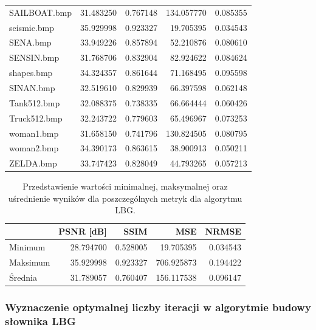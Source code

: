 \documentclass{article}
\begin{document}
\begin{table}[!ht]
\begin{tabular}{@{}lrrrr@{}}
    SAILBOAT.bmp       & 31.483250     & 0.767148 & 134.057770 & 0.085355 \\
    seismic.bmp        & 35.929998     & 0.923327 & 19.705395  & 0.034543 \\
    SENA.bmp           & 33.949226     & 0.857894 & 52.210876  & 0.080610 \\
    SENSIN.bmp         & 31.768706     & 0.832904 & 82.924622  & 0.084624 \\
    shapes.bmp         & 34.324357     & 0.861644 & 71.168495  & 0.095598 \\
    SINAN.bmp          & 32.519610     & 0.829939 & 66.397598  & 0.062148 \\
    Tank512.bmp        & 32.088375     & 0.738335 & 66.664444  & 0.060426 \\
    Truck512.bmp       & 32.243722     & 0.779603 & 65.496967  & 0.073253 \\
    woman1.bmp         & 31.658150     & 0.741796 & 130.824505 & 0.080795 \\
    woman2.bmp         & 34.390173     & 0.863615 & 38.900913  & 0.050211 \\
    ZELDA.bmp          & 33.747423     & 0.828049 & 44.793265  & 0.057213 \\
    \bottomrule
  \end{tabular}
\end{table}

\begin{table}[H]
  \caption{Przedstawienie wartości minimalnej, maksymalnej oraz uśrednienie wyników dla poszczególnych metryk dla algorytmu LBG.}
  \label{tab:lbg_summary}
  \centering
  \begin{tabular}{@{}lrrrr@{}}
    \toprule
             & PSNR {[}dB{]} & SSIM     & MSE        & NRMSE    \\ \midrule
    Minimum  & 28.794700     & 0.528005 & 19.705395  & 0.034543 \\
    Maksimum & 35.929998     & 0.923327 & 706.925873 & 0.194422 \\
    Średnia  & 31.789057     & 0.760407 & 156.117538 & 0.096147 \\
    \bottomrule
  \end{tabular}
\end{table}

\FloatBarrier

\subsubsection{Wyznaczenie optymalnej liczby iteracji w algorytmie budowy słownika LBG}
\end{document}
